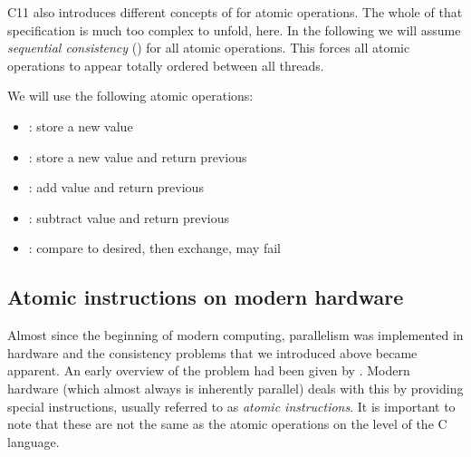 C11 also introduces different concepts of  for atomic
operations. The whole of that specification is much too complex to
unfold, here. In the following we will assume \emph{sequential
consistency} () for all atomic
operations. This forces all atomic operations to appear totally
ordered between all threads.

We will use the following atomic operations:
\itemadjust
\begin{itemize}
\item[] \hspace*{-3ex}: store a new value
\itemadjust
\item[] \hspace*{-3ex}: store a new value and
 return previous
\itemadjust
\item[] \hspace*{-3ex}: add value and
 return previous
\itemadjust
\item[] \hspace*{-3ex}: subtract value and
 return previous
\itemadjust
\item[] \hspace*{-3ex}: compare to desired, then
  exchange, may fail
\end{itemize}

\subsection{Atomic instructions on modern hardware}
\label{sec-2-2}
Almost since the beginning of modern computing, parallelism was
implemented in hardware and the consistency problems that we
introduced above became apparent.
An early overview of the problem had been given by
\cite{Netzer1992}.
Modern hardware
(which almost always is inherently parallel)
deals with this by providing special
instructions, usually referred to as \emph{atomic instructions}.
It is important to note that these are not the same as the atomic
operations on the level of the C language.

